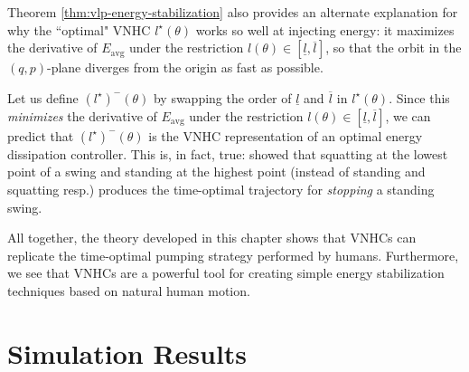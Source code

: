 Theorem \ref{thm:vlp-energy-stabilization} also provides an alternate
explanation for why the ``optimal" VNHC \(l^\star(\theta)\) works so well at
injecting energy: it maximizes the derivative of \(E_\text{avg}\) under the
restriction \(l(\theta) \in [\underline{l},\overline{l}]\), so that the orbit in the
\((q,p)\)-plane diverges from the origin as fast as possible. 

Let us define \((l^\star)^{-}(\theta)\) by swapping the order of 
\(\underline{l}\) and \(\overline{l}\) in \(l^\star(\theta)\). Since this 
\textit{minimizes} the derivative of \(E_\text{avg}\) under the restriction
\(l(\theta) \in [\underline{l},\overline{l}]\), we can predict that 
\((l^\star)^{-}(\theta)\) is the VNHC representation of an optimal 
energy dissipation controller.
This is, in fact, true: \cite{pumping_swing_standing_squatting} showed 
that squatting at the lowest point of a swing and standing at the highest
point (instead of standing and squatting resp.) produces the
time-optimal trajectory for \textit{stopping} a standing swing. 

All together, the theory developed in this chapter shows that VNHCs can
replicate the time-optimal pumping strategy performed by humans. 
Furthermore, we see that VNHCs are a powerful tool for creating simple energy
stabilization techniques based on natural human motion.

\section{Simulation Results}

